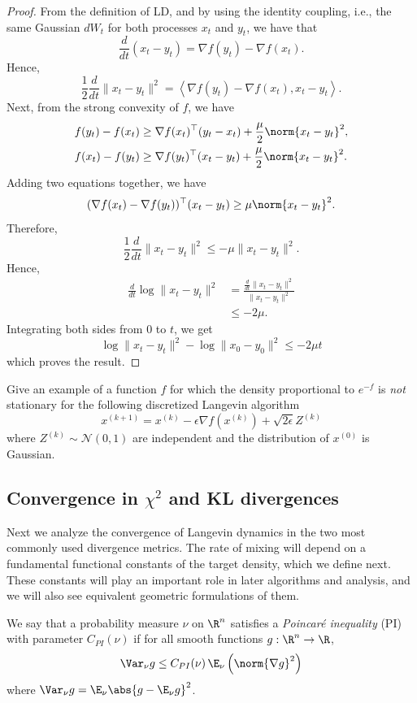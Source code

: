 \begin{proof}
From the definition of LD, and by using the identity coupling, i.e.,
the same Gaussian $dW_{t}$ for both processes $x_{t}$ and $y_{t}$,
we have that 
\[
\frac{d}{dt}\left(x_{t}-y_{t}\right)=\nabla f(y_{t})-\nabla f(x_{t}).
\]
Hence, 
\[
\frac{1}{2}\frac{d}{dt}\|x_{t}-y_{t}\|^{2}=\left\langle \nabla f(y_{t})-\nabla f(x_{t}),x_{t}-y_{t}\right\rangle .
\]
Next, from the strong convexity of $f$, we have 
\begin{align*}
f(y_{t})-f(x_{t}) & \ge\nabla f(x_{t})^{\top}(y_{t}-x_{t})+\frac{\mu}{2}\norm{x_{t}-y_{t}}^{2},\\
f(x_{t})-f(y_{t}) & \ge\nabla f(y_{t})^{\top}(x_{t}-y_{t})+\frac{\mu}{2}\norm{x_{t}-y_{t}}^{2}.
\end{align*}
Adding two equations together, we have
\[
(\nabla f(x_{t})-\nabla f(y_{t}))^{\top}(x_{t}-y_{t})\geq\mu\norm{x_{t}-y_{t}}^{2}.
\]
Therefore, 
\[
\frac{1}{2}\frac{d}{dt}\|x_{t}-y_{t}\|^{2}\leq-\mu\|x_{t}-y_{t}\|^{2}.
\]
 Hence, 
\begin{align*}
\frac{d}{dt}\log\|x_{t}-y_{t}\|^{2} & =\frac{\frac{d}{dt}\|x_{t}-y_{t}\|^{2}}{\|x_{t}-y_{t}\|^{2}}\\
 & \leq-2\mu.
\end{align*}
Integrating both sides from $0$ to $t$, we get 
\[
\log\|x_{t}-y_{t}\|^{2}-\log\|x_{0}-y_{0}\|^{2}\le-2\mu t
\]
which proves the result.
\end{proof}
\begin{xca}
Give an example of a function $f$ for which the density proportional
to $e^{-f}$ is \emph{not} stationary for the following discretized
Langevin algorithm 
\[
x^{(k+1)}=x^{(k)}-\epsilon\nabla f(x^{(k)})+\sqrt{2\epsilon}Z^{(k)}
\]
where $Z^{(k)}\sim\mathcal{N}(0,1)$ are independent and the distribution
of $x^{(0)}$ is Gaussian.
\end{xca}


\subsection{Convergence in $\chi^{2}$ and KL divergences}

Next we analyze the convergence of Langevin dynamics in the two most
commonly used divergence metrics. The rate of mixing will depend on
a fundamental functional constants of the target density, which we
define next. These constants will play an important role in later
algorithms and analysis, and we will also see equivalent geometric
formulations of them.
\begin{defn}
We say that a probability measure $\nu$ on $\R^{n}$ satisfies a
\emph{Poincar\'e inequality} (PI) with parameter $C_{PI}(\nu)$ if
for all smooth functions $g:\R^{n}\to\R$,
\begin{equation}
\Var_{\nu}g\leq C_{PI}(\nu)\,\E_{\nu}\left(\norm{\nabla g}^{2}\right)\label{eq:pi}
\end{equation}
where $\Var_{\nu}g=\E_{\nu}\abs{g-\E_{\nu}g}^{2}$.
\end{defn}

